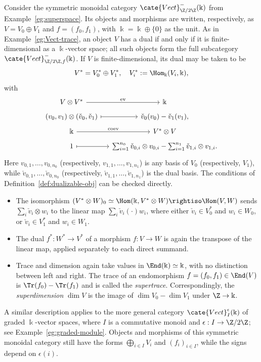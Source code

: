 \begin{example}\label{eg:superVect-trace}
	Consider the symmetric monoidal category
	$\cate{Vect}^-_{\Z/2\Z}(\Bbbk)$ from Example~\ref{eg:superspace}.
	Its objects and morphisms are written, respectively, as
	$V=V_0\oplus V_1$ and $f=(f_0,f_1)$, with
	$\Bbbk=\Bbbk\oplus\{0\}$ as the unit. As in
	Example~\ref{eg:Vect-trace}, an object $V$ has a dual if and only if it is
	finite-dimensional as a $\Bbbk$-vector space; all such objects form the
	full subcategory $\cate{Vect}^-_{\Z/2\Z, f}(\Bbbk)$. If $V$ is
	finite-dimensional, its dual may be taken to be
	\[ V^* = V^*_0 \oplus V^*_1, \quad V^*_i := \Hom_{\Bbbk}(V_i, \Bbbk), \]
	with
	\[\begin{tikzcd}[row sep=tiny, column sep=small]
		V \otimes V^* \arrow[r, "{\mathrm{ev}}"] & \Bbbk \\
		(v_0, v_1) \otimes (\check{v}_0, \check{v}_1) \arrow[mapsto, r] & \check{v}_0(v_0) - \check{v}_1(v_1), \\
		\Bbbk \arrow[r, "{\mathrm{coev}}"] & V^* \otimes V \\
		1 \arrow[mapsto, r] & \sum_{i=1}^{n_0} \check{v}_{0,i} \otimes v_{0,i} - \sum_{i=1}^{n_1} \check{v}_{1,i} \otimes v_{1,i}.
	\end{tikzcd}\]
	Here $v_{0,1},\ldots,v_{0,n_0}$ (respectively,
	$v_{1,1},\ldots,v_{1,n_1}$) is any basis of $V_0$ (respectively, $V_1$),
	while $\check v_{0,1},\ldots,\check v_{0,n_0}$ (respectively,
	$\check v_{1,1},\ldots,\check v_{1,n_1}$) is the dual basis. The
	conditions of Definition~\ref{def:dualizable-obj} can be checked directly.
	\begin{itemize}
		\item The isomorphism
		$(V^*\otimes W)_0\simeq\Hom(\Bbbk,V^*\otimes W)
		\rightiso\Hom(V,W)$ sends $\sum_i\check v_i\otimes w_i$ to the linear
		map $\sum_i\check v_i(\mathord\cdot)w_i$, where either
		$\check v_i\in V_0^*$ and $w_i\in W_0$, or
		$\check v_i\in V_1^*$ and $w_i\in W_1$.
		\item The dual $f^*:W^*\to V^*$ of a morphism $f:V\to W$ is again the
		transpose of the linear map, applied separately to each direct summand.
		\item Trace and dimension again take values in
		$\End(\Bbbk)\simeq\Bbbk$, with no distinction between left and right.
		The trace of an endomorphism $f=(f_0,f_1)\in\End(V)$ is
		$\Tr(f_0)-\Tr(f_1)$ and is called the \emph{supertrace}. Correspondingly,
		the \emph{superdimension} $\dim V$ is the image of
		$\dim V_0-\dim V_1$ under $\Z\to\Bbbk$.
	\end{itemize}

	A similar description applies to the more general category
	$\cate{Vect}^{\epsilon}_I(\Bbbk)$ of graded $\Bbbk$-vector spaces, where
	$I$ is a commutative monoid and $\epsilon:I\to\Z/2\Z$; see
	Example~\ref{eg:graded-module}. Objects and morphisms of this symmetric
	monoidal category still have the forms $\bigoplus_{i\in I}V_i$ and
	$(f_i)_{i\in I}$, while the signs depend on $\epsilon(i)$.
\end{example}

